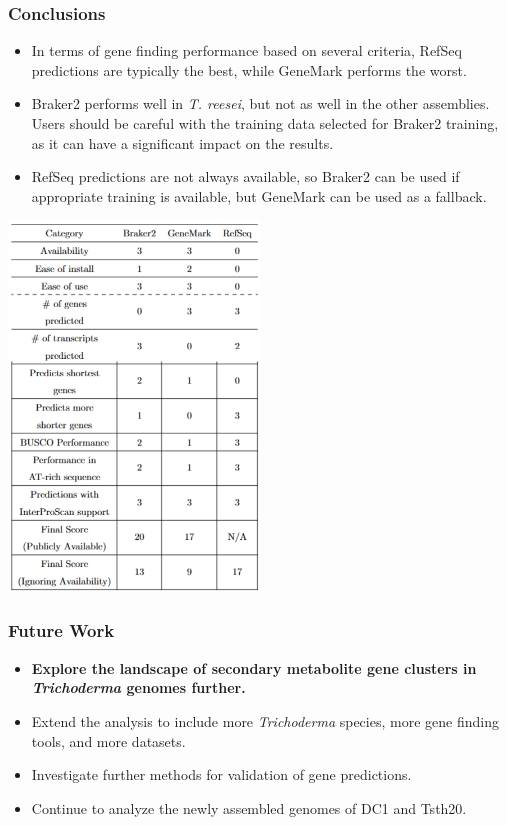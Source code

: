 \documentclass[t]{beamer}
\begin{document}
\begin{frame}
	\frametitle{Conclusions}
	\begin{itemize}
		\item In terms of gene finding performance based on several criteria, RefSeq predictions are typically the best, while GeneMark performs the worst.
		\item Braker2 performs well in \textit{T. reesei}, but not as well in the other assemblies. Users should be careful with the training data selected for Braker2 training, as it can have a significant impact on the results.
		\item RefSeq predictions are not always available, so Braker2 can be used if appropriate training is available, but GeneMark can be used as a fallback.
	\end{itemize}
\end{frame}

\begin{frame}
	\vspace{0.75cm}
	\centering
	\includegraphics[width=0.5\textwidth]{../../working-thesis/figures/conclusion-snip.png}
\end{frame}

\begin{frame}
	\frametitle{Future Work}
	\begin{itemize}
		\item \textbf{Explore the landscape of secondary metabolite gene clusters in \textit{Trichoderma} genomes further.}
		\item Extend the analysis to include more \textit{Trichoderma} species, more gene finding tools, and more datasets.
		\item Investigate further methods for validation of gene predictions.
		\item Continue to analyze the newly assembled genomes of DC1 and Tsth20.
	\end{itemize}
\end{frame}
\end{document}

